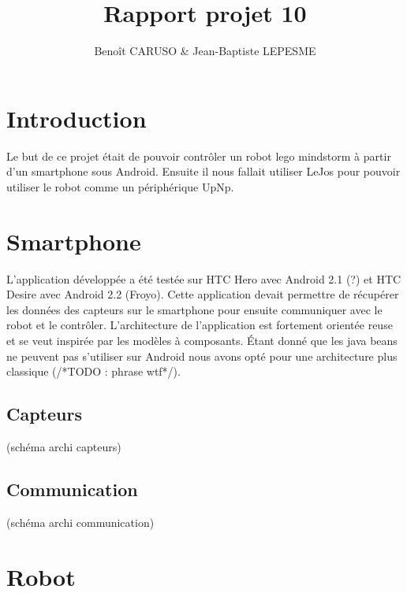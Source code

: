 \documentclass[10pt,a4paper]{article}
\author{Benoît CARUSO & Jean-Baptiste LEPESME}
\title{Rapport projet 10}
\begin{document}
\maketitle

\section{Introduction}
	Le but de ce projet était de pouvoir contr\^oler un robot lego mindstorm à partir d'un smartphone sous Android.
	Ensuite il nous fallait utiliser LeJos pour pouvoir utiliser le robot comme un périphérique UpNp.
\section{Smartphone}
	L'application développée a été testée sur HTC Hero avec Android 2.1 (?) et HTC Desire avec Android 2.2 (Froyo).
	Cette application devait permettre de récupérer les données des capteurs sur le smartphone pour ensuite communiquer avec le robot et le contr\^oler.
	L'architecture de l'application est fortement orientée reuse et se veut inspirée par les modèles à composants.
	Étant donné que les java beans ne peuvent pas s'utiliser sur Android nous avons opté pour une architecture plus classique (/*TODO : phrase wtf*/).	
	\subsection{Capteurs}
	(schéma archi capteurs)
	\subsection{Communication}
	(schéma archi communication)

\section{Robot}
\end{document}
